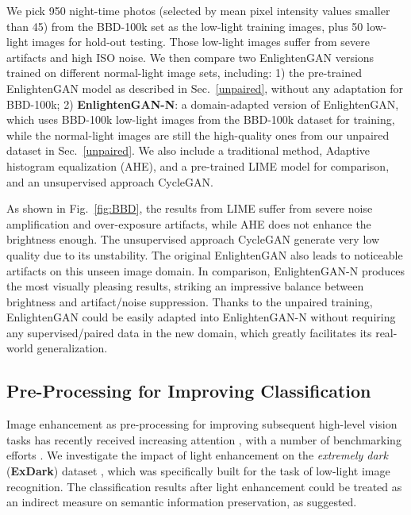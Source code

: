 \documentclass[journal]{IEEEtran}
\begin{document}
We pick 950 night-time photos (selected by mean pixel intensity values smaller than 45) from the BBD-100k set as the low-light training images, plus 50 low-light images for hold-out testing. Those low-light images suffer from severe artifacts and high ISO noise.
We then compare two EnlightenGAN versions trained on different normal-light image sets, including: 1) the pre-trained EnlightenGAN model as described in Sec.~\ref{unpaired}, without any adaptation for BBD-100k; 
2) \textbf{EnlightenGAN-N}: a domain-adapted version of EnlightenGAN, which uses BBD-100k low-light images from the BBD-100k dataset for training, while the normal-light images are still the high-quality ones from our unpaired dataset in Sec.~\ref{unpaired}. We also include a traditional method, Adaptive histogram equalization (AHE), and a pre-trained LIME model for comparison, and an unsupervised approach CycleGAN.

As shown in Fig.~\ref{fig:BBD}, the results from LIME suffer from severe noise amplification and over-exposure artifacts, while AHE does not enhance the brightness enough. The unsupervised approach CycleGAN generate very low quality due to its unstability. The original EnlightenGAN also leads to noticeable artifacts on this unseen image domain. In comparison, EnlightenGAN-N produces the most visually pleasing results, striking an impressive balance between brightness and artifact/noise suppression. Thanks to the unpaired training, EnlightenGAN could be easily adapted into EnlightenGAN-N without requiring any supervised/paired data in the new domain, which greatly facilitates its real-world generalization. 










\subsection{Pre-Processing for Improving Classification}
\label{classification}


Image enhancement as pre-processing for improving subsequent high-level vision tasks has recently received increasing attention \cite{kupyn2017deblurgan,li2017aod,liu2018improved,kupyn2019deblurgan}, with a number of benchmarking efforts  \cite{li2019benchmarking,yuan2019ug,li2019single,yang2020advancing}. We investigate the impact of light enhancement on the \textit{extremely dark} (\textbf{ExDark}) dataset \cite{Exdark}, which was specifically built for the task of low-light image recognition. The classification results after light enhancement could be treated as an indirect measure on semantic information preservation, as \cite{kupyn2017deblurgan,li2019benchmarking} suggested. 
\end{document}
